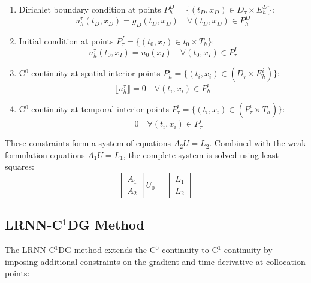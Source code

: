 \documentclass[11pt,a4paper]{article}
\begin{document}
\begin{enumerate}
    \item Dirichlet boundary condition at points $P_h^D = \{(t_D, x_D) \in D_\tau \times E_h^D\}$:
    \begin{equation}
    u_h^\tau(t_D, x_D) = g_D(t_D, x_D) \quad \forall (t_D, x_D) \in P_h^D
    \end{equation}
    
    \item Initial condition at points $P_\tau^I = \{(t_0, x_I) \in t_0 \times T_h\}$:
    \begin{equation}
    u_h^\tau(t_0, x_I) = u_0(x_I) \quad \forall (t_0, x_I) \in P_\tau^I
    \end{equation}
    
    \item C$^0$ continuity at spatial interior points $P_h^i = \{(t_i, x_i) \in (D_\tau \times E_h^i)\}$:
    \begin{equation}
    \llbracket u_h^\tau \rrbracket = 0 \quad \forall (t_i, x_i) \in P_h^i
    \end{equation}
    
    \item C$^0$ continuity at temporal interior points $P_\tau^i = \{(t_i, x_i) \in (P_\tau^i \times T_h)\}$:
    \begin{equation}
    [u_h^\tau(t_i, x_i)] = 0 \quad \forall (t_i, x_i) \in P_\tau^i
    \end{equation}
\end{enumerate}

These constraints form a system of equations $A_2 U = L_2$. Combined with the weak formulation equations $A_1 U = L_1$, the complete system is solved using least squares:
\begin{equation}
\begin{bmatrix} A_1 \\ A_2 \end{bmatrix} U_0 = \begin{bmatrix} L_1 \\ L_2 \end{bmatrix}
\end{equation}

\subsection{LRNN-C$^1$DG Method}

The LRNN-C$^1$DG method extends the C$^0$ continuity to C$^1$ continuity by imposing additional constraints on the gradient and time derivative at collocation points:
\end{document}
